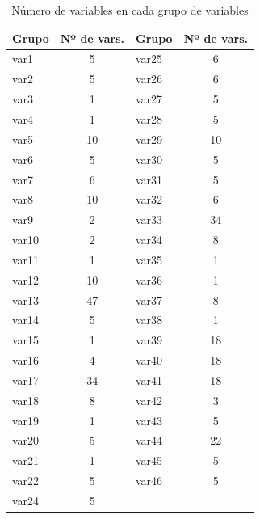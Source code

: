 \documentclass[11pt,a4paper,spanish]{article} %
\begin{document}
\newpage

\vspace{2cm}

\begin{table}[htbp]
\begin{center}
\begin{tabular}{|l|c|||l|c|}             \hline
  \textbf{Grupo} & \textbf{Nº de vars.}  & \textbf{Grupo} & \textbf{Nº de vars.} \\  \hline
  var1  &   5  &  var25 &   6  \\ \hline 
  var2  &   5  &  var26 &   6  \\ \hline 
  var3  &   1  &  var27 &   5  \\ \hline 
  var4  &   1  &  var28 &   5  \\ \hline 
  var5  &  10  &  var29 &  10  \\ \hline 
  var6  &   5  &  var30 &   5  \\ \hline
  var7  &   6  &  var31 &   5  \\ \hline
  var8  &  10  &  var32 &   6  \\ \hline
  var9  &   2  &  var33 &  34  \\ \hline
  var10 &   2  &  var34 &   8  \\ \hline
  var11 &   1  &  var35 &   1  \\ \hline
  var12 &  10  &  var36 &   1  \\ \hline
  var13 &  47  &  var37 &   8  \\ \hline
  var14 &   5  &  var38 &   1  \\ \hline
  var15 &   1  &  var39 &  18  \\ \hline
  var16 &   4  &  var40 &  18  \\ \hline
  var17 &  34  &  var41 &  18  \\ \hline
  var18 &   8  &  var42 &   3  \\ \hline
  var19 &   1  &  var43 &   5  \\ \hline
  var20 &   5  &  var44 &  22  \\ \hline
  var21 &   1  &  var45 &   5  \\ \hline
  var22 &   5  &  var46 &   5  \\ \hline
  var24 &   5  &        &      \\ \hline

\end{tabular}
\caption{Número de variables en cada grupo de variables}
\end{center}
\end{table}
\end{document}
